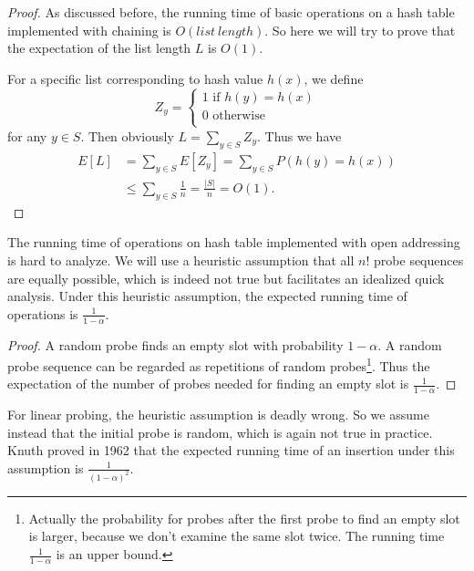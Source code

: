 \begin{proof}
As discussed before, the running time of basic operations on a hash table implemented with chaining is $O(list\:length)$. So here we will try to prove that the expectation of the list length $L$ is $O(1)$. 

For a specific list corresponding to hash value $h(x)$, we define 
\begin{equation*}
Z_y=\begin{cases}
1\text{ if }h(y)=h(x)\\
0\text{ otherwise}\\
\end{cases}
\end{equation*}
for any $y\in S$. Then obviously $L=\sum\limits_{y\in S}Z_y$. Thus we have
\begin{align*}
E[L]&= \sum\limits_{y\in S}E[Z_y]=\sum\limits_{y\in S}P(h(y)=h(x))\\
&\leq\sum\limits_{y\in S}\frac{1}{n}=\frac{\lvert S\rvert}{n}=O(1).
\end{align*}
\end{proof}
The running time of operations on hash table implemented with open addressing is hard to analyze. We will use a heuristic assumption that all $n!$ probe sequences are equally possible, which is indeed not true but facilitates an idealized quick analysis. Under this heuristic assumption, the expected running time of operations is $\frac{1}{1-\alpha}$. 
\begin{proof}
A random probe finds an empty slot with probability $1-\alpha$. A random probe sequence can be regarded as repetitions of random probes\footnote{Actually the probability for probes after the first probe to find an empty slot is larger, because we don't examine the same slot twice. The running time $\frac{1}{1-\alpha}$ is an upper bound.}. Thus the expectation of the number of probes needed for finding an empty slot is $\frac{1}{1-\alpha}$.
\end{proof}
For linear probing, the heuristic assumption is deadly wrong. So we assume instead that the initial probe is random, which is again not true in practice. Knuth proved in 1962 that the expected running time of an insertion under this assumption is $\frac{1}{(1-\alpha)^2}$.
